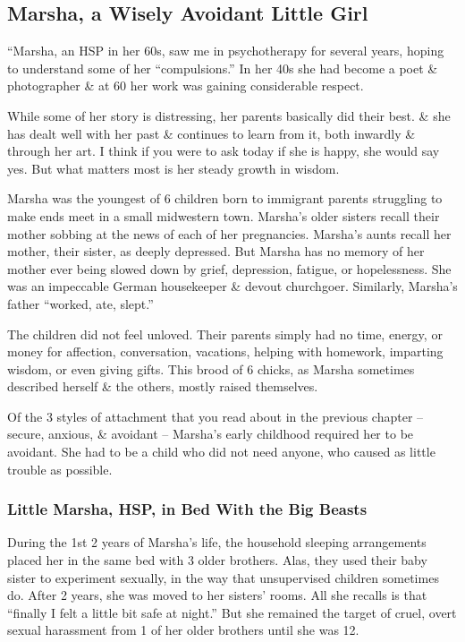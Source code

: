 \documentclass{article}
\numberwithin{equation}{section}
\begin{document}
\subsection{Marsha, a Wisely Avoidant Little Girl}
``Marsha, an HSP in her 60s, saw me in psychotherapy for several years, hoping to understand some of her ``compulsions.'' In her 40s she had become a poet \& photographer \& at 60 her work was gaining considerable respect.

While some of her story is distressing, her parents basically did their best. \& she has dealt well with her past \& continues to learn from it, both inwardly \& through her art. I think if you were to ask today if she is happy, she would say yes. But what matters most is her steady growth in wisdom.

Marsha was the youngest of 6 children born to immigrant parents struggling to make ends meet in a small midwestern town. Marsha's older sisters recall their mother sobbing at the news of each of her pregnancies. Marsha's aunts recall her mother, their sister, as deeply depressed. But Marsha has no memory of her mother ever being slowed down by grief, depression, fatigue, or hopelessness. She was an impeccable German housekeeper \& devout churchgoer. Similarly, Marsha's father ``worked, ate, slept.''

The children did not feel unloved. Their parents simply had no time, energy, or money for affection, conversation, vacations, helping with homework, imparting wisdom, or even giving gifts. This brood of 6 chicks, as Marsha sometimes described herself \& the others, mostly raised themselves.

Of the 3 styles of attachment that you read about in the previous chapter -- secure, anxious, \& avoidant -- Marsha's early childhood required her to be avoidant. She had to be a child who did not need anyone, who caused as little trouble as possible.

\subsubsection{Little Marsha, HSP, in Bed With the Big Beasts}
During the 1st 2 years of Marsha's life, the household sleeping arrangements placed her in the same bed with 3 older brothers. Alas, they used their baby sister to experiment sexually, in the way that unsupervised children sometimes do. After 2 years, she was moved to her sisters' rooms. All she recalls is that ``finally I felt a little bit safe at night.'' But she remained the target of cruel, overt sexual harassment from 1 of her older brothers until she was 12.
\end{document}
